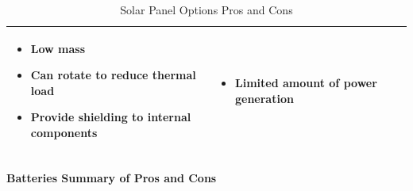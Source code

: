 \begin{table}[H]
\begin{tabular}{|p{}|p{}|p{}|}
\begin{itemize}
        \item Low mass
        \item Can rotate to reduce thermal load
        \item Provide shielding to internal components
    \end{itemize}
    &
    \begin{itemize}
        \item Limited amount of power generation
    \end{itemize}
    \\
\hline
\end{tabular}
\caption{Solar Panel Options Pros and Cons}
\label{tbl:SolarPanel_ProCon}
\end{table}
\paragraph{Batteries Summary of Pros and Cons} ~\\ ~\\
